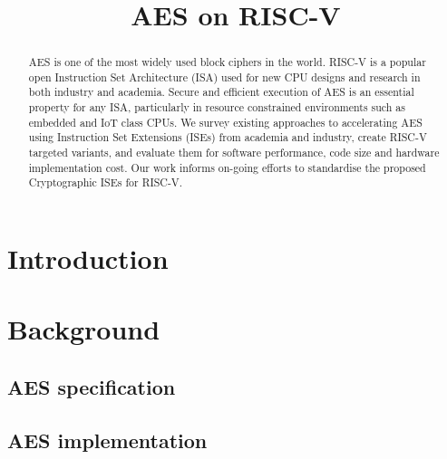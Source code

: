 \documentclass[submission]{iacrtrans}
\title{AES on RISC-V}
\author{}
\institute{}
\author{}
\institute{}
\begin{document}

\maketitle

\begin{abstract}
AES is one of the most widely used block ciphers in the world.
RISC-V is a popular open Instruction Set Architecture (ISA) used
for new CPU designs and research in both industry and academia.
Secure and efficient execution of AES is an essential property for any ISA,
particularly in resource constrained environments such as embedded and IoT
class CPUs.
We survey existing approaches to accelerating AES using Instruction Set
Extensions (ISEs) from academia and industry, create RISC-V targeted variants,
and evaluate them for software performance, code size and hardware
implementation cost.
Our work informs on-going efforts to standardise the proposed Cryptographic
ISEs for RISC-V.
\end{abstract}


\section{Introduction}
\label{sec:intro}



\section{Background}
\label{sec:bg}


\subsection{AES  specification}
\label{sec:bg:aes_spec}



\subsection{AES implementation}
\label{sec:bg:aes_impl}
\end{document}
